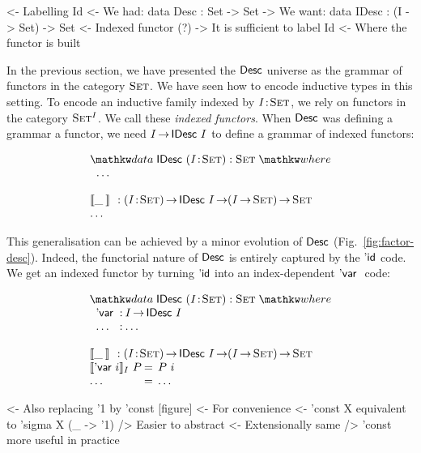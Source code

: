 \begin{wstructure}
<- Labelling Id
    <- We had: data Desc : Set -> Set
    -> We want: data IDesc : (I -> Set) -> Set
        <- Indexed functor (?)
        -> It is sufficient to label Id
            <- Where the functor is built
\end{wstructure}

In the previous section, we have presented the $\Desc$ universe as the
grammar of functors in the category $\Set$. We have seen how to encode
inductive types in this setting. To encode an inductive family indexed
by $\Bhab{\V{I}}{\Set}$, we rely on functors in the category
$\Set^I$. We call these \emph{indexed functors}. When $\Desc$ was
defining a grammar a functor, we need $I \To \IDesc{I}$ to define a
grammar of indexed functors:

\[\stk{
\data \IDesc{} (\Bhab{\V{I}}{\Set}) : \Set \where \\
\;\;\ldots \\
\\
\idescop{\_\:}{}{} : \PI{\V{I}}{\Set} \IDesc{I} \To (\V{I} \To \Set) \To \Set    \\
\ldots
}\]

This generalisation can be achieved by a minor evolution of $\Desc$
(Fig.~\ref{fig:factor-desc}). Indeed, the functorial nature of $\Desc$
is entirely captured by the $\DId$ code. We get an indexed functor
by turning $\DId$ into an index-dependent $\DVar$ code:

\[\stk{
\data \IDesc{} (\Bhab{\V{I}}{\Set}) : \Set \where \\
\;\;\begin{array}{@{}l@{\::\:}l@{\quad}l}
    \DVar{}         & I \To \IDesc{I}                                   \\
    \ldots          & \ldots
\end{array} \\
\\
\idescop{\_\:}{}{} : \PI{\V{I}}{\Set} \IDesc{I} \To (\V{I} \To \Set) \To \Set        \\
\begin{array}{@{}l@{\:=\:\:}ll}
\idescop{\DVar{i}}{I}{P}      &  P~i                                                 \\
\ldots                        &  \ldots
\end{array}
}\]

\begin{wstructure}
<- Also replacing '1 by 'const  [figure]
    <- For convenience
        <- 'const X equivalent to 'sigma X (\_ -> '1)
        /> Easier to abstract
            <- Extensionally same
            /> 'const more useful in practice
\end{wstructure}

